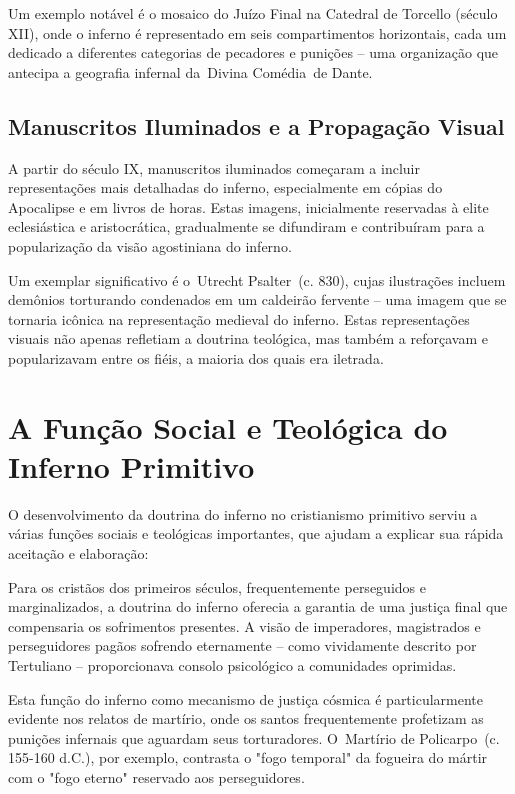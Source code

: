 Um exemplo notável é o mosaico do Juízo Final na Catedral de Torcello (século XII), onde o inferno é representado em seis compartimentos horizontais, cada um dedicado a diferentes categorias de pecadores e punições -- uma organização que antecipa a geografia infernal da Divina Comédia de Dante.

\subsection{Manuscritos Iluminados e a Propagação Visual}

A partir do século IX, manuscritos iluminados começaram a incluir representações mais detalhadas do inferno, especialmente em cópias do Apocalipse e em livros de horas. Estas imagens, inicialmente reservadas à elite eclesiástica e aristocrática, gradualmente se difundiram e contribuíram para a popularização da visão agostiniana do inferno.

Um exemplar significativo é o Utrecht Psalter (c. 830), cujas ilustrações incluem demônios torturando condenados em um caldeirão fervente -- uma imagem que se tornaria icônica na representação medieval do inferno. Estas representações visuais não apenas refletiam a doutrina teológica, mas também a reforçavam e popularizavam entre os fiéis, a maioria dos quais era iletrada.

\section{A Função Social e Teológica do Inferno Primitivo}

O desenvolvimento da doutrina do inferno no cristianismo primitivo serviu a várias funções sociais e teológicas importantes, que ajudam a explicar sua rápida aceitação e elaboração:

Para os cristãos dos primeiros séculos, frequentemente perseguidos e marginalizados, a doutrina do inferno oferecia a garantia de uma justiça final que compensaria os sofrimentos presentes. A visão de imperadores, magistrados e perseguidores pagãos sofrendo eternamente -- como vividamente descrito por Tertuliano -- proporcionava consolo psicológico a comunidades oprimidas.

Esta função do inferno como mecanismo de justiça cósmica é particularmente evidente nos relatos de martírio, onde os santos frequentemente profetizam as punições infernais que aguardam seus torturadores. O Martírio de Policarpo (c. 155-160 d.C.), por exemplo, contrasta o "fogo temporal" da fogueira do mártir com o "fogo eterno" reservado aos perseguidores.

